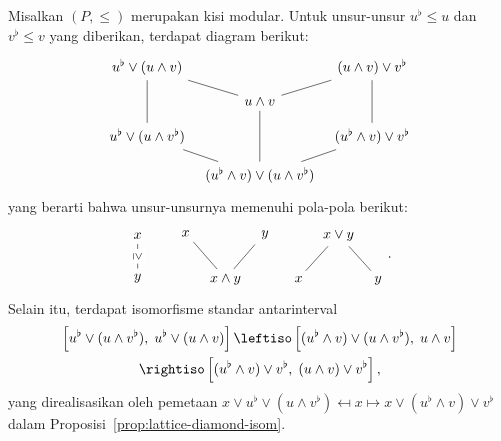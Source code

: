 \begin{teorema}\label{prop:lattice-Zassenhaus}
	Misalkan $(P,\leq)$ merupakan kisi modular. Untuk unsur-unsur
	$u^\flat \leq u$ dan $v^\flat \leq v$ yang diberikan, terdapat diagram
	berikut:
	\[ \begin{tikzcd}[column sep=tiny, row sep=small]
		u^\flat \vee (u \wedge v) \arrow[dash, dd] \arrow[dash, rd] & & (u \wedge v) \vee v^\flat \arrow[dash, dd] \arrow[dash, ld] \\
		& u \wedge v \arrow[dash, dd] & \\
		u^\flat \vee (u \wedge v^\flat) \arrow[dash, rd] & & (u^\flat \wedge v) \vee v^\flat \arrow[dash, ld] \\
		& (u^\flat \wedge v) \vee (u \wedge v^\flat)
	\end{tikzcd} \]
	yang berarti bahwa unsur-unsurnya memenuhi pola-pola berikut:
	\begin{equation}\label{eqn:Zassenhaus-cases}
	\begin{tikzcd}
		x \arrow[dash, d, "\geq" description, sloped] \\ y
	\end{tikzcd} \qquad
	\begin{tikzcd}[column sep=tiny]
		x \arrow[dash, rd] & & y \arrow[dash, ld] \\
		& x \wedge y &
	\end{tikzcd} \quad
	\begin{tikzcd}[column sep=tiny]
		{} & x \vee y \arrow[dash, ld] \arrow[dash, rd] & \\
		x & & y
	\end{tikzcd} .
	\end{equation}
	Selain itu, terdapat isomorfisme standar antarinterval
	\begin{multline*}
		\left[ u^\flat \vee (u \wedge v^\flat), \; u^\flat \vee (u \wedge v) \right] \leftiso \left[ (u^\flat \wedge v) \vee (u \wedge v^\flat), \; u \wedge v \right] \\
		\rightiso \left[ (u^\flat \wedge v) \vee v^\flat, \; (u \wedge v) \vee v^\flat \right],
	\end{multline*}
	yang direalisasikan oleh pemetaan
	$x \vee u^\flat \vee (u \wedge v^\flat) \mapsfrom x \mapsto
	x \vee (u^\flat \wedge v) \vee v^\flat$ dalam
	Proposisi~\ref{prop:lattice-diamond-isom}.
\end{teorema}
